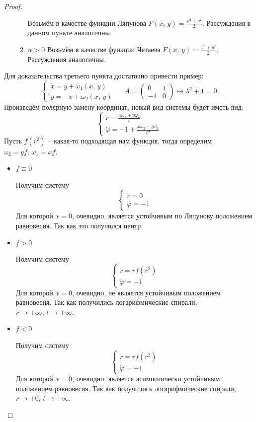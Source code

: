 \documentclass[a4paper,12pt]{article}
\renewcommand{\phi}{\ensuremath{\varphi}}
\theoremstyle{plain}
\theoremstyle{definition}
\theoremstyle{remark}
\begin{document}
\begin{proof}
\begin{itemize}
\begin{enumerate}
			            Возьмём в качестве функции Ляпунова $F(x,\,y) = \frac{x^2 + y^2}{2}$. Рассуждения в данном пункте аналогичны.
			      \item $\alpha > 0$
			            Возьмём в качестве функции Четаева $F(x,\,y) = \frac{x^2 + y^2}{2}$. Рассуждения аналогичны.
		      \end{enumerate}
	\end{itemize}

	Для доказательства третьего пункта достаточно привести пример:
	\[\begin{cases}
			\dot{x} = y + \omega_1(x,\,y) \\
			\dot{y} = -x + \omega_2(x,\,y)
		\end{cases}\;\;\;\;\; A = \begin{pmatrix}
			0  & 1 \\
			-1 & 0
		\end{pmatrix} \mapsto \lambda^2 + 1 = 0\]
	Произведём полярную замену координат, новый вид системы будет иметь вид:
	\[\begin{cases}
			\dot{r} = \frac{x\omega_1 + y\omega_2}{r} \\
			\dot{\phi} = -1 + \frac{x\omega_2 - y\omega_1}{r^2}
		\end{cases}\]
	Пусть $f(r^2)$ -- какая-то подходящая нам функция, тогда определим $\omega_2 = yf,\, \omega_1 = xf$.
	\begin{itemize}
		\item $f \equiv 0$

		      Получим систему
		      \[\begin{cases}
				      \dot{r} = 0 \\
				      \dot{\phi} = -1
			      \end{cases}\]
		      Для которой $x = 0$, очевидно, является устойчивым по Ляпунову положением равновесия. Так как это получился центр.
		\item $f > 0$

		      Получим систему
		      \[\begin{cases}
				      \dot{r} = rf(r^2) \\
				      \dot{\phi} = -1
			      \end{cases}\]
		      Для которой $x = 0$, очевидно, не является устойчивым положением равновесия. Так как получились логарифмические спирали, $r \to +\infty,\, t \to +\infty$.
		\item $f < 0$

		      Получим систему
		      \[\begin{cases}
				      \dot{r} = rf(r^2) \\
				      \dot{\phi} = -1
			      \end{cases}\]
		      Для которой $x = 0$, очевидно, является асимпотически устойчивым положением равновесия. Так как получились логарифмические спирали, $r \to +0,\, t \to +\infty$.
	\end{itemize}
\end{proof}
\end{document}
